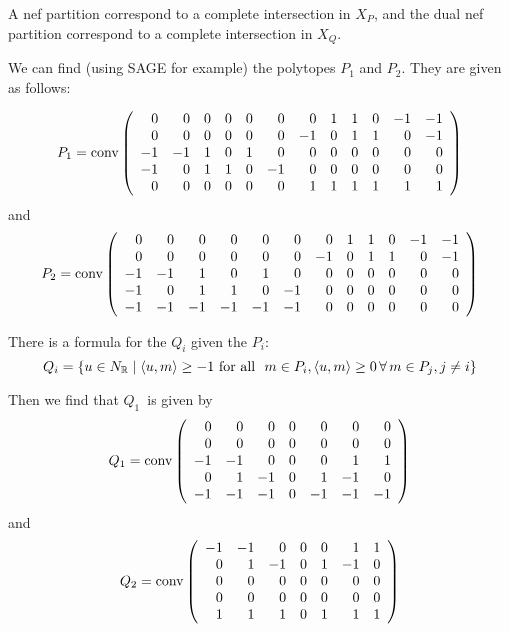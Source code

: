\documentclass[11pt, english]{article}
\begin{document}
A nef partition correspond to a complete intersection in $X_P$, and the dual nef partition correspond to a complete intersection in $X_Q$. 

We can find (using SAGE for example) the polytopes $P_1$ and $P_2$. They are given as follows:

\begin{equation}
P_1 = \operatorname{conv}
\left(\begin{array}{rrrrrrrrrrrr}
0 & 0 & 0 & 0 & 0 & 0 & 0 & 1 & 1 & 0 & -1 & -1 \\
0 & 0 & 0 & 0 & 0 & 0 & -1 & 0 & 1 & 1 & 0 & -1 \\
-1 & -1 & 1 & 0 & 1 & 0 & 0 & 0 & 0 & 0 & 0 & 0 \\
-1 & 0 & 1 & 1 & 0 & -1 & 0 & 0 & 0 & 0 & 0 & 0 \\
0 & 0 & 0 & 0 & 0 & 0 & 1 & 1 & 1 & 1 & 1 & 1
\end{array}\right)
\end{equation}
and
\begin{equation}
P_2 = \operatorname{conv} \left(\begin{array}{rrrrrrrrrrrr}
0 & 0 & 0 & 0 & 0 & 0 & 0 & 1 & 1 & 0 & -1 & -1 \\
0 & 0 & 0 & 0 & 0 & 0 & -1 & 0 & 1 & 1 & 0 & -1 \\
-1 & -1 & 1 & 0 & 1 & 0 & 0 & 0 & 0 & 0 & 0 & 0 \\
-1 & 0 & 1 & 1 & 0 & -1 & 0 & 0 & 0 & 0 & 0 & 0 \\
-1 & -1 & -1 & -1 & -1 & -1 & 0 & 0 & 0 & 0 & 0 & 0
\end{array}\right)
\end{equation}

There is a formula for the $Q_i$ given the $P_i$:
$$
Q_i = \{ u \in N_\R \mid \langle u,m \rangle \geq -1 \text{ for all } m \in P_i, \langle u,m\rangle \geq 0 \, \forall \, m \in P_j, j\neq i \}
$$

Then we find that $Q_1$ is given by
\begin{equation}
Q_1 = \operatorname{conv} \left(\begin{array}{rrrrrrr}
0 & 0 & 0 & 0 & 0 & 0 & 0 \\
0 & 0 & 0 & 0 & 0 & 0 & 0 \\
-1 & -1 & 0 & 0 & 0 & 1 & 1 \\
0 & 1 & -1 & 0 & 1 & -1 & 0 \\
-1 & -1 & -1 & 0 & -1 & -1 & -1
\end{array}\right)
\end{equation}
and
\begin{equation}
Q_2 = \operatorname{conv} \left(\begin{array}{rrrrrrr}
-1 & -1 & 0 & 0 & 0 & 1 & 1 \\
0 & 1 & -1 & 0 & 1 & -1 & 0 \\
0 & 0 & 0 & 0 & 0 & 0 & 0 \\
0 & 0 & 0 & 0 & 0 & 0 & 0 \\
1 & 1 & 1 & 0 & 1 & 1 & 1
\end{array}\right)
\end{equation}
\end{document}
